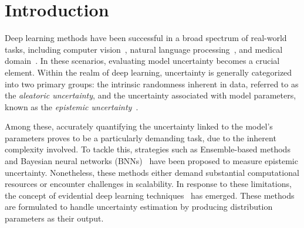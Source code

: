 \section{Introduction}
Deep learning methods have been successful in a broad spectrum of real-world tasks, including computer vision~\cite{godard2017unsupervised,he2016deep}, natural language processing~\cite{zhao2023evaluating,devlin2018bert,vaswani2017attention}, and medical domain~\cite{ye2023bidirectional}. %
In these scenarios, evaluating model uncertainty becomes a crucial element. Within the realm of deep learning, uncertainty is generally categorized into two primary groups: the intrinsic randomness inherent in data, referred to as the \textit{aleatoric uncertainty}, and the uncertainty associated with model parameters, known as the \textit{epistemic uncertainty}~\cite{gal2016dropout,guo2017calibration}.

Among these, accurately quantifying the uncertainty linked to the model's parameters proves to be a particularly demanding task, due to the inherent complexity involved.
To tackle this, strategies such as Ensemble-based methods~\cite{pearce2020uncertainty,lakshminarayanan2017simple} and Bayesian neural networks (BNNs)~\cite{gal2016dropout,wilson2020bayesian,blundell2015weight} have been proposed to measure epistemic uncertainty. 
Nonetheless, these methods either demand substantial computational resources or encounter challenges in scalability. In response to these limitations, the concept of evidential deep learning techniques~\cite{sensoy2018evidential,NEURIPS2020_aab08546,malinin2018predictive} has emerged. These methods are formulated to handle uncertainty estimation by producing distribution parameters as their output.



